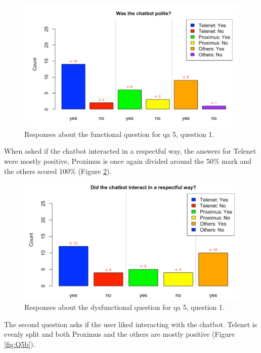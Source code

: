 \begin{figure}[!htb]
	\centering
	\includegraphics[width=375pt]{../LaTeX/Figures/Comparative/Q5.png}
	\caption{Responses about the functional question for \acrshort{qa} 5, question 1.}\label{fig:Q5}
\end{figure}
When asked if the chatbot interacted in a respectful way, the answers for Telenet were mostly positive, Proximus is once again divided around the 50\% mark and the others scored 100\% (Figure \ref{fig:DQ5}).\\
\begin{figure}[!htb]
	\centering
	\includegraphics[width=375pt]{../LaTeX/Figures/Comparative/DQ5.png}
	\caption{Responses about the dysfunctional question for \acrshort{qa} 5, question 1.}\label{fig:DQ5}
\end{figure}
\break
The second question asks if the user liked interacting with the chatbot. Telenet is evenly split and both Proximus and the others are mostly positive (Figure \ref{fig:Q5b}).\\
